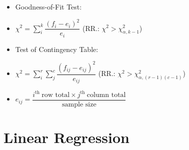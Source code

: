 \documentclass[%
 aip,
 jmp,%
 amsmath,amssymb,
 reprint,%
]{revtex4-1}
\begin{document}
\begin{itemize}[label={}]
\item Goodness-of-Fit Test:
\item $\chi^2=\sum_{i}^{k} \dfrac{(f_i-e_i)^2}{e_i}$ {\small(RR.: $\chi^2 > \chi^2_{\alpha,k-1}$)}
\item Test of Contingency Table:
\item $\chi^2=\sum_i^r\sum_j^c \dfrac{(f_{ij}-e_{ij})^2}{e_{ij}}$ {\small(RR.: $\chi^2 > \chi^2_{\alpha,(r-1)(c-1)}$)}
\item $e_{ij} = \dfrac{i^{\textrm{th}}\ \textrm{row total} \times j^{\textrm{th}}\ \textrm{column total}}{\textrm{sample size}}$
\end{itemize}


\section{Linear Regression}
\end{document}
